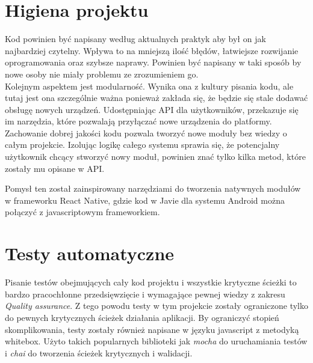 \section{Higiena projektu}
Kod powinien być napisany według aktualnych praktyk aby był on jak najbardziej czytelny. Wpływa to na mniejszą ilość błędów, łatwiejsze rozwijanie  oprogramowania oraz szybsze naprawy. Powinien być napisany w taki sposób by nowe osoby nie miały problemu ze zrozumieniem go. \\
Kolejnym aspektem jest modularność. Wynika ona z kultury pisania kodu, ale tutaj jest ona szczególnie ważna ponieważ zakłada się, że będzie się stale dodawać obsługę nowych urządzeń. Udostępniając API dla użytkowników, przekazuje się im narzędzia, które pozwalają przyłączać nowe urządzenia do platformy. Zachowanie dobrej jakości kodu pozwala tworzyć nowe moduły bez wiedzy o całym projekcie. Izolując logikę całego systemu sprawia się, że potencjalny użytkownik chcący stworzyć nowy moduł, powinien znać tylko kilka metod, które zostały mu opisane w API. 
\par Pomysł ten został zainspirowany narzędziami do tworzenia natywnych modułów w frameworku React Native, gdzie kod w Javie dla systemu Android można połączyć z javascriptowym frameworkiem. 
\section{Testy automatyczne}
Pisanie testów obejmujących cały kod projektu i wszystkie krytyczne ścieżki to bardzo pracochłonne przedsięwzięcie i wymagające pewnej wiedzy z zakresu \textit{Quality assurance}. Z tego powodu testy w tym projekcie zostały ograniczone tylko do pewnych krytycznych ścieżek działania aplikacji. By ograniczyć stopień skomplikowania, testy zostały również napisane w języku javascript z metodyką whitebox. Użyto takich popularnych biblioteki jak \textit{mocha} do uruchamiania testów i \textit{chai} do tworzenia ścieżek krytycznych i walidacji. \cite{chai, mocha}
